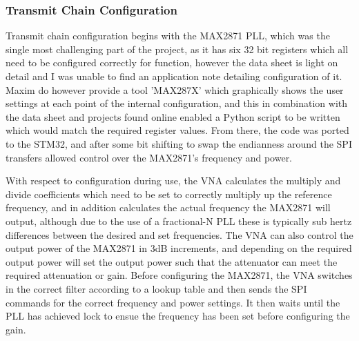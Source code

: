 \subsubsection{Transmit Chain Configuration}
Transmit chain configuration begins with the MAX2871 PLL, which was the single most challenging part of the project, as it has six 32 bit registers which all need to be configured correctly for function, however the data sheet is light on detail and I was unable to find an application note detailing configuration of it. Maxim do however provide a tool 'MAX287X' which graphically shows the user settings at each point of the internal configuration, and this in combination with the data sheet and projects found online \cite{max2871_trans} \cite{max2871_synth} enabled a Python script to be written which would match the required register values. From there, the code was ported to the STM32, and after some bit shifting to swap the endianness around the SPI transfers allowed control over the MAX2871's frequency and power. 

With respect to configuration during use, the VNA calculates the multiply and divide coefficients which need to be set to correctly multiply up the reference frequency, and in addition calculates the actual frequency the MAX2871 will output, although due to the use of a fractional-N PLL these is typically sub hertz differences between the desired and set frequencies. The VNA can also control the output power of the MAX2871 in 3dB increments, and depending on the required output power will set the output power such that the attenuator can meet the required attenuation or gain. Before configuring the MAX2871, the VNA switches in the correct filter according to a lookup table and then sends the SPI commands for the correct frequency and power settings. It then waits until the PLL has achieved lock to ensue the frequency has been set before configuring the gain. 

